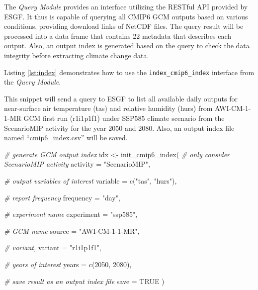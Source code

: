 \documentclass[twocolumn, a4paper,10pt]{article}
\newenvironment{Shaded}{\begin{mdframed}[skipabove=0pt]}{\end{mdframed}}
\newcommand{\AttributeTok}[1]{\textcolor[rgb]{0.77,0.63,0.00}{#1}}
\newcommand{\CommentTok}[1]{\textcolor[rgb]{0.56,0.35,0.01}{\textit{#1}}}
\newcommand{\ConstantTok}[1]{\textcolor[rgb]{0.00,0.00,0.00}{#1}}
\newcommand{\DecValTok}[1]{\textcolor[rgb]{0.00,0.00,0.81}{#1}}
\newcommand{\FunctionTok}[1]{\textcolor[rgb]{0.00,0.00,0.00}{#1}}
\newcommand{\NormalTok}[1]{#1}
\newcommand{\OtherTok}[1]{\textcolor[rgb]{0.56,0.35,0.01}{#1}}
\newcommand{\StringTok}[1]{\textcolor[rgb]{0.31,0.60,0.02}{#1}}
\begin{document}
The \emph{Query Module} provides an interface utilizing the RESTful API provided by
ESGF. It thus is capable of querying all CMIP6 GCM outputs based on various
conditions, providing download links of NetCDF files. The query result will be
processed into a data frame that contains 22 metadata that describes each
output. Also, an output index is generated based on the query to
check the data integrity before extracting climate change data.

Listing \ref{lst:index} demonstrates how to use the \texttt{index\_cmip6\_index}
interface from the \emph{Query Module}.

This snippet will send a query to ESGF to list all available daily outputs for
near-surface air temperature (tas) and relative humidity (hurs) from
AWI-CM-1-1-MR GCM first run (r1i1p1f1) under SSP585 climate scenario from the
ScenarioMIP activity for the year 2050 and 2080. Also, an output index file
named ``cmip6\_index.csv'' will be saved.

\label{lst:index}

\begin{Shaded}
\begin{Highlighting}[]
\CommentTok{\# generate GCM output index}
\NormalTok{idx }\OtherTok{\textless{}{-}} \FunctionTok{init\_cmip6\_index}\NormalTok{(}
  \CommentTok{\# only consider ScenarioMIP activity}
  \AttributeTok{activity =} \StringTok{"ScenarioMIP"}\NormalTok{,}

  \CommentTok{\# output variables of interest}
  \AttributeTok{variable =} \FunctionTok{c}\NormalTok{(}\StringTok{"tas"}\NormalTok{, }\StringTok{"hurs"}\NormalTok{),}

  \CommentTok{\# report frequency}
  \AttributeTok{frequency =} \StringTok{"day"}\NormalTok{,}

  \CommentTok{\# experiment name}
  \AttributeTok{experiment =} \StringTok{"ssp585"}\NormalTok{,}

  \CommentTok{\# GCM name}
  \AttributeTok{source =} \StringTok{"AWI{-}CM{-}1{-}1{-}MR"}\NormalTok{,}

  \CommentTok{\# variant,}
  \AttributeTok{variant =} \StringTok{"r1i1p1f1"}\NormalTok{,}

  \CommentTok{\# years of interest}
  \AttributeTok{years =} \FunctionTok{c}\NormalTok{(}\DecValTok{2050}\NormalTok{, }\DecValTok{2080}\NormalTok{),}

  \CommentTok{\# save result as an output index file}
  \AttributeTok{save =} \ConstantTok{TRUE}
\NormalTok{)}
\end{Highlighting}
\end{Shaded}
\end{document}
